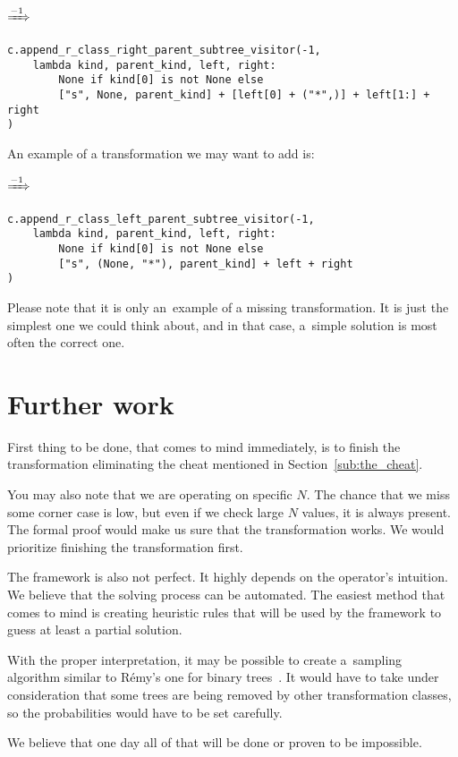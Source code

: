 \documentclass[final]{article}
\theoremstyle{definition}
\theoremstyle{definition}
\theoremstyle{remark}
\newcommand{\includeinlinescaledsvg}[3]{\begin{minipage}{#1\textwidth}\begin{center}\end{center}\end{minipage}}
\begin{document}
\begin{center}
    \includeinlinescaledsvg{.4}{.7}{lambda__transformations__013a}%
    \(\xRightarrow{-1}\)%
    \includeinlinescaledsvg{.4}{.7}{lambda__transformations__013b}%
\end{center}

\begin{lstlisting}
c.append_r_class_right_parent_subtree_visitor(-1,
    lambda kind, parent_kind, left, right:
        None if kind[0] is not None else
        ["s", None, parent_kind] + [left[0] + ("*",)] + left[1:] + right
)
\end{lstlisting}

An example of a transformation we may want to add is:

\begin{center}
    \includeinlinescaledsvg{.4}{.7}{lambda__transformations__014a}%
    \(\xRightarrow{-1}\)%
    \includeinlinescaledsvg{.4}{.7}{lambda__transformations__014b}%
\end{center}

\begin{lstlisting}
c.append_r_class_left_parent_subtree_visitor(-1,
    lambda kind, parent_kind, left, right:
        None if kind[0] is not None else
        ["s", (None, "*"), parent_kind] + left + right
)
\end{lstlisting}

Please note that it is only an~example of a missing transformation. It is just the simplest one we could think about, and in that case, a~simple solution is most often the correct one.

\section{Further work}%
\label{sec:further_work}

First thing to be done, that comes to mind immediately, is to finish the transformation eliminating the cheat mentioned in Section~\ref{sub:the_cheat}.

You may also note that we are operating on specific \(N\). The chance that we miss some corner case is low, but even if we check large \(N\) values, it is always present. The formal proof would make us sure that the transformation works. We would prioritize finishing the transformation first.

The framework is also not perfect. It highly depends on the operator's intuition. We believe that the solving process can be automated. The easiest method that comes to mind is creating heuristic rules that will be used by the framework to guess at least a partial solution.

With the proper interpretation, it may be possible to create a~sampling algorithm similar to Rémy's one for binary trees~\cite{remy,note}. It would have to take under consideration that some trees are being removed by other transformation classes, so the probabilities would have to be set carefully.

We believe that one day all of that will be done or proven to be impossible.

\clearpage

\printbibliography%
\end{document}
